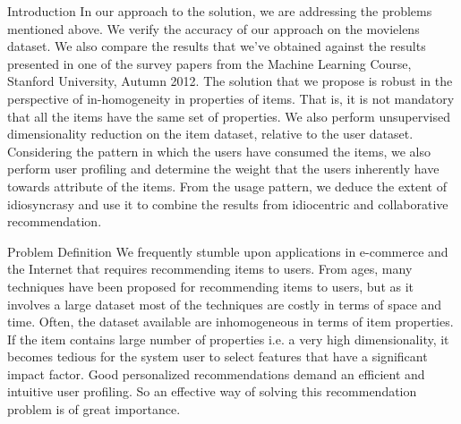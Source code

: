 \documentclass{report}
\begin{document}
\begin{projChapter}{Introduction}
        In our approach to the solution, we are addressing the problems mentioned above. We verify the accuracy of our approach on the movielens dataset. We also compare the results that we've obtained against the results presented in one of the survey papers from the Machine Learning Course, Stanford University, Autumn 2012. The solution that we propose is robust in the perspective of in-homogeneity in properties of items. That is, it is not mandatory that all the items have the same set of properties. We also perform unsupervised dimensionality reduction on the item dataset, relative to the user dataset. Considering the pattern in which the users have consumed the items, we also perform user profiling and determine the weight that the users inherently have towards attribute of the items. From the usage pattern, we deduce the extent of idiosyncrasy and use it to combine the results from idiocentric and collaborative recommendation.\end{projChapter}

\begin{projChapter}{Problem Definition}
        We frequently stumble upon applications in e-commerce and the Internet that requires recommending items to users. From ages, many techniques have been proposed for recommending items to users, but as it involves a large dataset most of the techniques are costly in terms of space and time. Often, the dataset available are inhomogeneous in terms of item properties. If the item contains large number of properties i.e. a very high dimensionality, it becomes tedious for the system user to select features that have a significant impact factor. Good personalized recommendations demand an efficient and intuitive user profiling. So an effective way of solving this recommendation problem is of great importance.
    \end{projChapter}
\end{document}
